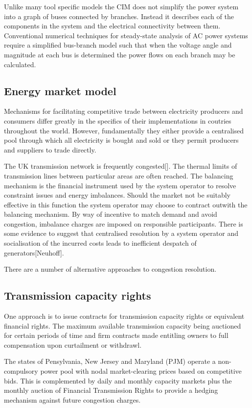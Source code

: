 Unlike many tool specific models the CIM does not simplify the power system
into a graph of buses connected by branches.  Instead it describes each of the
components in the system and the electrical connectivity between them.
Conventional numerical techniques for steady-state analysis of AC power
systems require a simplified bus-branch model such that when the voltage angle
and magnitude at each bus is determined the power flows on each branch may be
calculated.


\subsection{Energy market model}
Mechanisms for facilitating competitive trade between electricity producers and
consumers differ greatly in the specifics of their implementations in coutries
throughout the world.  However, fundamentally they either provide a
centralised pool through which all electricity is bought and sold or they
permit producers and suppliers to trade directly.

The UK transmission network is frequently congested[].  The thermal limits of
transmission lines between particular areas are often reached.  The balancing
mechanism is the financial instrument used by the system operator to resolve
constraint issues and energy imbalances.  Should the market not be suitably
effective in this function the system operator may choose to contract outwith
the balancing mechanism.  By way of incentive to match demand and avoid
congestion, imbalance charges are imposed on responsible participants.  There
is some evidence to suggest that centralised resolution by a system operator
and socialisation of the incurred costs leads to inefficient despatch of
generators[Neuhoff].

There are a number of alternative approaches to congestion
resolution\cite{neuhoff:power}.

\subsection{Transmission capacity rights}
One approach is to issue contracts for transmission capacity rights or
equivalent financial rights.  The maximum available transmission capacity
being auctioned for certain periods of time and firm contracts made entitling
owners to full compensation upon curtailment or
withdrawl\cite{efet:principles}.

The states of Pensylvania, New Jersey and Maryland (PJM) operate a
non-compulsory power pool with nodal market-clearing prices based on
competitive bids.  This is complemented by daily and monthly capacity markets
plus the monthly auction of Financial Transmission Rights to provide a hedging
mechanism against future congestion charges.



